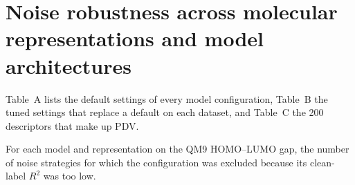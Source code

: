 \section{Noise robustness across molecular representations and model architectures}\label{app:add:robustness}

\label{app:noise:sec:hyperparameters_default}\label{app:noise:sec:hyperparameters_tuned}\label{app:noise:sec:pdv_descriptors}
Table~A lists the default settings of every model configuration, Table~B the tuned settings that replace a default on each dataset, and Table~C the 200 descriptors that make up PDV.




\label{app:noise:sec:excluded_configurations}
For each model and representation on the QM9 HOMO--LUMO gap, the number of noise strategies for which the configuration was excluded because its clean-label $R^2$ was too low.


